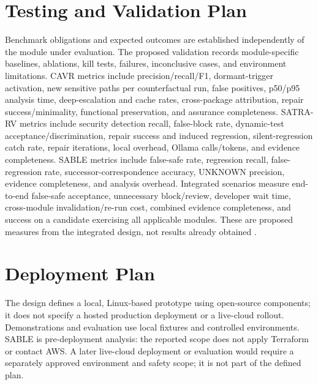 \section{Testing and Validation Plan}
Benchmark obligations and expected outcomes are established independently of the module under evaluation. The proposed validation records module-specific baselines, ablations, kill tests, failures, inconclusive cases, and environment limitations. CAVR metrics include precision/recall/F1, dormant-trigger activation, new sensitive paths per counterfactual run, false positives, p50/p95 analysis time, deep-escalation and cache rates, cross-package attribution, repair success/minimality, functional preservation, and assurance completeness. SATRA-RV metrics include security detection recall, false-block rate, dynamic-test acceptance/discrimination, repair success and induced regression, silent-regression catch rate, repair iterations, local overhead, Ollama calls/tokens, and evidence completeness. SABLE metrics include false-safe rate, regression recall, false-regression rate, successor-correspondence accuracy, UNKNOWN precision, evidence completeness, and analysis overhead. Integrated scenarios measure end-to-end false-safe acceptance, unnecessary block/review, developer wait time, cross-module invalidation/re-run cost, combined evidence completeness, and success on a candidate exercising all applicable modules. These are proposed measures from the integrated design, not results already obtained \cite{asentIntegratedResearchDesign}.

\section{Deployment Plan}
The design defines a local, Linux-based prototype using open-source components; it does not specify a hosted production deployment or a live-cloud rollout. Demonstrations and evaluation use local fixtures and controlled environments. SABLE is pre-deployment analysis: the reported scope does not apply Terraform or contact AWS. A later live-cloud deployment or evaluation would require a separately approved environment and safety scope; it is not part of the defined plan.

